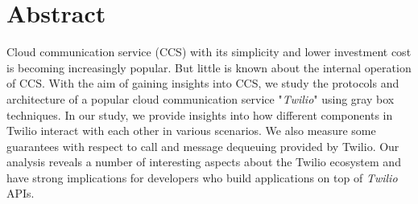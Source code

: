 \section{Abstract}
\label{sec-abstract}
Cloud communication service (CCS) with its simplicity and lower investment cost is becoming increasingly popular. But little is known about the internal operation of  CCS. With the aim of gaining insights into CCS, we study the protocols and architecture of a popular cloud communication service "\textit{Twilio}" using gray box techniques. 
In our study, we  provide insights into how different components in Twilio interact with each other in various scenarios. We also measure some guarantees with respect to call and message dequeuing provided by Twilio. Our analysis reveals a number of interesting aspects about the Twilio ecosystem and have strong implications for developers who build applications on top of \textit{Twilio} APIs.
